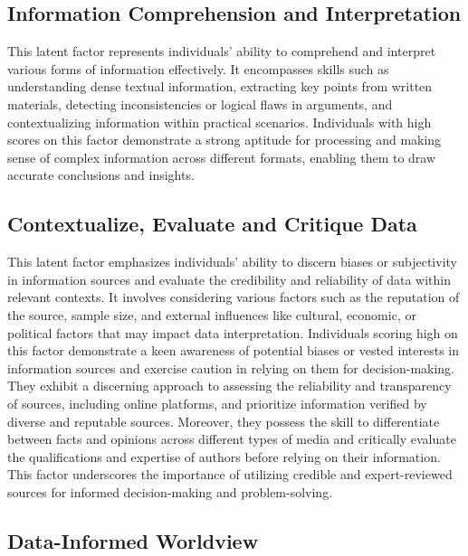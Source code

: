 \documentclass[
  12pt,
  a4paper,
  twoside]{article}
\begin{document}
\hypertarget{information-comprehension-and-interpretation}{%
\subsection{Information Comprehension and Interpretation}\label{information-comprehension-and-interpretation}}

This latent factor represents individuals' ability to comprehend and interpret various forms of information effectively. It encompasses skills such as understanding dense textual information, extracting key points from written materials, detecting inconsistencies or logical flaws in arguments, and contextualizing information within practical scenarios. Individuals with high scores on this factor demonstrate a strong aptitude for processing and making sense of complex information across different formats, enabling them to draw accurate conclusions and insights.

\hypertarget{contextualize-evaluate-and-critique-data}{%
\subsection{Contextualize, Evaluate and Critique Data}\label{contextualize-evaluate-and-critique-data}}

This latent factor emphasizes individuals' ability to discern biases or subjectivity in information sources and evaluate the credibility and reliability of data within relevant contexts. It involves considering various factors such as the reputation of the source, sample size, and external influences like cultural, economic, or political factors that may impact data interpretation. Individuals scoring high on this factor demonstrate a keen awareness of potential biases or vested interests in information sources and exercise caution in relying on them for decision-making. They exhibit a discerning approach to assessing the reliability and transparency of sources, including online platforms, and prioritize information verified by diverse and reputable sources. Moreover, they possess the skill to differentiate between facts and opinions across different types of media and critically evaluate the qualifications and expertise of authors before relying on their information. This factor underscores the importance of utilizing credible and expert-reviewed sources for informed decision-making and problem-solving.

\hypertarget{data-informed-worldview}{%
\subsection{Data-Informed Worldview}\label{data-informed-worldview}}
\end{document}
